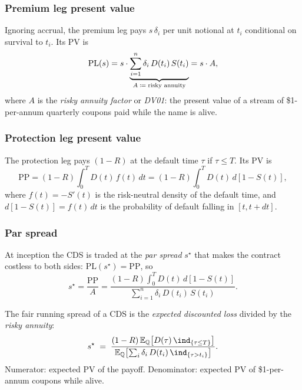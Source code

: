 \subsubsection*{Premium leg present value}

Ignoring accrual, the premium leg pays $s\,\delta_i$ per unit
notional at $t_i$ conditional on survival to $t_i$.  Its PV is
\begin{equation}
\label{eq:cds_pl}
  \mathrm{PL}(s)
  = s \cdot \underbrace{\sum_{i=1}^n \delta_i \, D(t_i) \, S(t_i)}_{A \;\coloneqq\; \text{risky annuity}}
  = s \cdot A,
\end{equation}
where $A$ is the \emph{risky annuity factor} or \emph{DV01}: the
present value of a stream of \$1-per-annum quarterly coupons paid
while the name is alive.

\subsubsection*{Protection leg present value}

The protection leg pays $(1-R)$ at the default time $\tau$ if
$\tau \le T$.  Its PV is
\begin{equation}
\label{eq:cds_pp}
  \mathrm{PP}
  = (1 - R) \int_0^T D(t)\, f(t)\, dt
  = (1 - R) \int_0^T D(t)\, d[1 - S(t)],
\end{equation}
where $f(t) = -S'(t)$ is the risk-neutral density of the default
time, and $d[1 - S(t)] = f(t)\,dt$ is the probability of default
falling in $[t, t+dt]$.

\subsubsection*{Par spread}

At inception the CDS is traded at the \emph{par spread} $s^\star$
that makes the contract costless to both sides:
$\mathrm{PL}(s^\star) = \mathrm{PP}$, so
\begin{equation}
\label{eq:cds_par}
\boxed{
  s^\star
  = \frac{\mathrm{PP}}{A}
  = \frac{(1 - R) \int_0^T D(t) \, d[1 - S(t)]}
         {\sum_{i=1}^n \delta_i \, D(t_i) \, S(t_i)}.
}
\end{equation}

\begin{keyfactbox}
The fair running spread of a CDS is the \emph{expected discounted
loss} divided by the \emph{risky annuity}:
\[
  s^\star \;=\; \frac{(1-R)\,\E_\Qm\!\left[D(\tau)\,\ind_{\{\tau \le T\}}\right]}
                       {\E_\Qm\!\left[\sum_i \delta_i\, D(t_i)\, \ind_{\{\tau > t_i\}}\right]}.
\]
Numerator: expected PV of the payoff.  Denominator: expected PV of
\$1-per-annum coupons while alive.
\end{keyfactbox}

